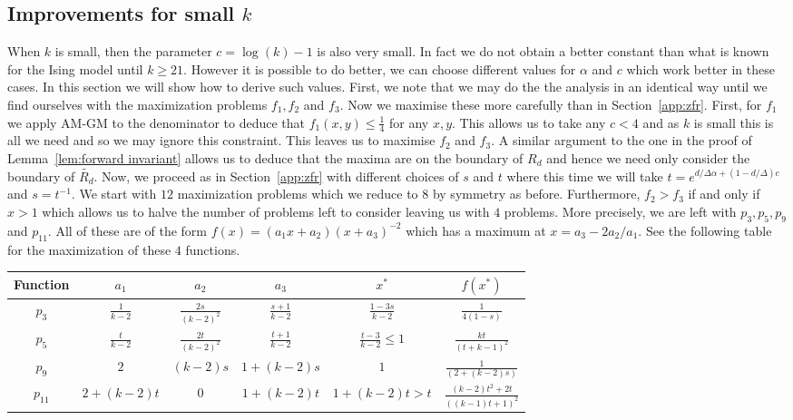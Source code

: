 \documentclass[10pt,a4paper]{article}
\theoremstyle{definition}
\begin{document}
\subsection{Improvements for small \texorpdfstring{$k$}{k}}
When $k$ is small, then the parameter $c=\log(k)-1$ is also very small.
In fact we do not obtain a better constant than what is known for the Ising model until $k \geq 21$.
However it is possible to do better, we can choose different values for $\alpha$ and $c$ which work better in these cases.
In this section we will show how to derive such values.
%
First, we note that we may do the the analysis in an identical way until we find ourselves with the maximization problems $f_1, f_2$ and $f_3$.
Now we maximise these more carefully than in Section~\ref{app:zfr}.
First, for $f_1$ we apply AM-GM to the denominator to deduce that $f_1(x,y) \leq \frac{1}{4}$ for any $x,y$.
This allows us to take any $c<4$ and as $k$ is small this is all we need and so we may ignore this constraint.
This leaves us to maximise $f_2$ and $f_3$.
A similar argument to the one in the proof of Lemma~\ref{lem:forward invariant} allows us to deduce that the maxima are on the boundary of $R_d$ and hence we need only consider the boundary of $\widetilde{R_d}$.
%
Now, we proceed as in Section~\ref{app:zfr} with different choices of $s$ and $t$ where this time we will take $t=e^{d/\Delta \alpha + (1-d/\Delta)c}$ and $s=t^{-1}$.
We start with $12$ maximization problems which we reduce to $8$ by symmetry as before.
Furthermore, $f_2>f_3$ if and only if $x>1$ which allows us to halve the number of problems left to consider leaving us with $4$ problems.
More precisely, we are left with $p_3, p_5, p_9$ and $p_{11}$.
All of these are of the form $f(x)=(a_1 x+a_2)(x+a_3)^{-2}$ which has a maximum at $x=a_3-2a_2/a_1$.
See the following table for the maximization of these $4$ functions.
%
\begin{center}
\begin{tabular}{ |c|c|c|c|c|c| }
\hline
Function & $a_1$ & $a_2$ & $a_3$ & $x^*$ & $f(x^*)$ 
\\ \hline
$p_3$ & $\frac{1}{k-2}$ & $\frac{2s}{(k-2)^2}$ & $\frac{s+1}{k-2}$ & $\frac{1-3s}{k-2}$ & $\frac{1}{4(1-s)}$
\\ \hline
$p_5$ & $\frac{t}{k-2}$ & $\frac{2t}{(k-2)^2}$ & $\frac{t+1}{k-2}$ & $\frac{t-3}{k-2}\leq 1$ & $\frac{kt}{(t+k-1)^2}$
\\ \hline
$p_9$ & $2$ & $(k-2)s$ & $1+(k-2)s$ & $1$ & $\frac{1}{(2+(k-2)s)}$
\\ \hline
$p_{11}$ & $2+(k-2)t$ & $0$ & $1+(k-2)t$ & $1+(k-2)t>t$ & $\frac{(k-2)t^2+2t}{((k-1)t+1)^2}$
\\ \hline
\end{tabular}
\end{center}
\end{document}
